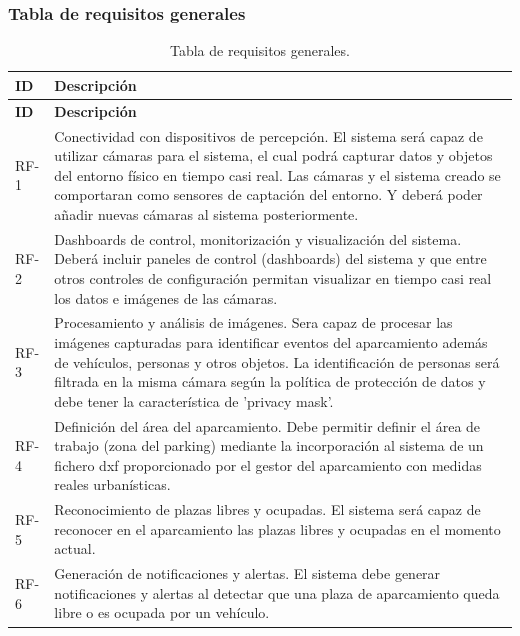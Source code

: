 \documentclass[12pt,a4paper]{article}
\begin{document}
	\subsubsection{Tabla de requisitos generales}
	
	\begin{longtable}{p{} p{}}
		\caption{Tabla de requisitos generales.}\label{tab:requisitos-generales}\\
		\toprule
		\textbf{ID} & \textbf{Descripción} \\
		\toprule
		\endfirsthead
		
		\toprule
		\textbf{ID} & \textbf{Descripción} \\
		\toprule
		\endhead
		
		RF-1 & Conectividad con dispositivos de percepción. El sistema será capaz de utilizar cámaras para el sistema, el cual podrá capturar datos y objetos del entorno físico en tiempo casi real. Las cámaras y el sistema creado se comportaran como sensores de captación del entorno. Y deberá poder añadir nuevas cámaras al sistema posteriormente. \\
		\midrule
		RF-2 & Dashboards de control, monitorización y visualización del sistema. Deberá incluir paneles de control (dashboards) del sistema y que entre otros controles de configuración permitan visualizar en tiempo casi real los datos e imágenes de las cámaras. \\
		\midrule
		RF-3 & Procesamiento y análisis de imágenes. Sera capaz de procesar las imágenes capturadas para identificar eventos del aparcamiento además de vehículos, personas y otros objetos. La identificación de personas será filtrada en la misma cámara según la política de protección de datos y debe tener la característica de 'privacy mask'. \\
		\midrule
		RF-4 & Definición del área del aparcamiento. Debe permitir definir el área de trabajo (zona del parking) mediante la incorporación al sistema de un fichero dxf proporcionado por el gestor del aparcamiento con medidas reales urbanísticas. \\
		\midrule
		RF-5 & Reconocimiento de plazas libres y ocupadas. El sistema será capaz de reconocer en el aparcamiento las plazas libres y ocupadas en el momento actual. \\
		\midrule
		RF-6 & Generación de notificaciones y alertas. El sistema debe generar notificaciones y alertas al detectar que una plaza de aparcamiento queda libre o es ocupada por un vehículo. \\

\end{longtable}
\end{document}
